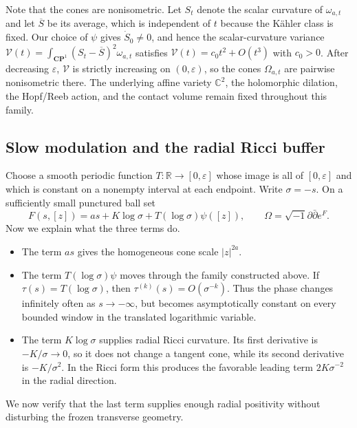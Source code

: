 \documentclass[11pt]{amsart}
\theoremstyle{definition}
\theoremstyle{remark}
\begin{document}
Note that the cones are nonisometric.  Let $S_t$ denote the scalar curvature of $\omega_{a,t}$ and let $\overline S$ be its average, which is independent of $t$ because the K\"ahler class is fixed.  Our choice of $\psi$ gives $\dot S_0\neq0$, and hence the scalar-curvature variance $\mathcal V(t)=\int_{\mathbf{CP}^1}(S_t-\overline S)^2\omega_{a,t}$ satisfies $\mathcal V(t)=c_0t^2+O(t^3)$ with $c_0>0$.  After decreasing $\varepsilon$, $\mathcal V$ is strictly increasing on $(0,\varepsilon)$, so the cones $\Omega_{a,t}$ are pairwise nonisometric there.  The underlying affine variety $\mathbb C^2$, the holomorphic dilation, the Hopf/Reeb action, and the contact volume remain fixed throughout this family.

\subsection{Slow modulation and the radial Ricci buffer}
\label{subsec:appendix-modulation}

Choose a smooth periodic function $T:\mathbb R\to[0,\varepsilon]$ whose image is all of $[0,\varepsilon]$ and which is constant on a nonempty interval at each endpoint.  Write $\sigma=-s$.  On a sufficiently small punctured ball set
\begin{equation}\label{eq:appendix-main-potential}
F(s,[z])=as+K\log\sigma+T(\log\sigma)\psi([z]),
\qquad
\Omega=\sqrt{-1}\partial\bar\partial e^F.
\end{equation}
Now we explain what the three terms do.
\begin{itemize}
\item The term $as$ gives the homogeneous cone scale $|z|^{2a}$.
\item The term $T(\log\sigma)\psi$ moves through the family constructed above.  If $\tau(s)=T(\log\sigma)$, then $\tau^{(k)}(s)=O(\sigma^{-k})$.  Thus the phase changes infinitely often as $s\to-\infty$, but becomes asymptotically constant on every bounded window in the translated logarithmic variable.
\item The term $K\log\sigma$ supplies radial Ricci curvature.  Its first derivative is $-K/\sigma\to0$, so it does not change a tangent cone, while its second derivative is $-K/\sigma^2$.  In the Ricci form this produces the favorable leading term $2K\sigma^{-2}$ in the radial direction.
\end{itemize}
We now verify that the last term supplies enough radial positivity without disturbing the frozen transverse geometry.
\end{document}
